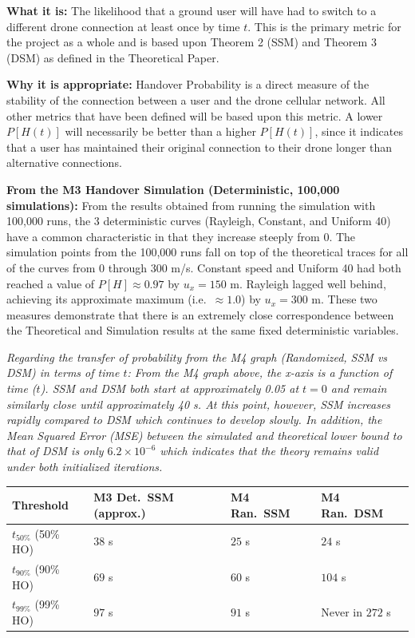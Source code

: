 \documentclass[11pt]{article}
\newcommand{\highlight}[1]{\textit{#1}}
\begin{document}
\begin{enumerate}[label=\textbf{Scribe Question \arabic*:}, leftmargin=*, itemsep=1.5em]
\textbf{What it is:} The likelihood that a ground user will have had to switch to a different drone
connection at least once by time $t$. This is the primary metric for the project as a whole and is
based upon Theorem 2 (SSM) and Theorem 3 (DSM) as defined in the Theoretical Paper.

\textbf{Why it is appropriate:} Handover Probability is a direct measure of the stability of the
connection between a user and the drone cellular network. All other metrics that have been defined
will be based upon this metric. A lower $P[H(t)]$ will necessarily be better than a higher $P[H(t)]$,
since it indicates that a user has maintained their original connection to their drone longer than
alternative connections.

\textbf{From the M3 Handover Simulation (Deterministic, 100,000 simulations):} From the results
obtained from running the simulation with 100,000 runs, the 3 deterministic curves (Rayleigh,
Constant, and Uniform 40) have a common characteristic in that they increase steeply from 0. The
simulation points from the 100,000 runs fall on top of the theoretical traces for all of the curves from
0 through 300 m/s. Constant speed and Uniform 40 had both reached a value of $P[H] \approx 0.97$
by $u_x = 150$ m. Rayleigh lagged well behind, achieving its approximate maximum
(i.e.\ $\approx 1.0$) by $u_x = 300$ m. These two measures demonstrate that there is an extremely
close correspondence between the Theoretical and Simulation results at the same fixed deterministic
variables.

\highlight{Regarding the transfer of probability from the M4 graph (Randomized, SSM vs DSM) in
terms of time $t$: From the M4 graph above, the x-axis is a function of time ($t$). SSM and DSM both
start at approximately 0.05 at $t=0$ and remain similarly close until approximately 40 s. At this point,
however, SSM increases rapidly compared to DSM which continues to develop slowly. In addition,
the Mean Squared Error (MSE) between the simulated and theoretical lower bound to that of DSM is
only $6.2 \times 10^{-6}$ which indicates that the theory remains valid under both initialized
iterations.}

\vspace{0.3cm}
\begin{center}
\begin{tabular}{llll}
    \toprule
    \textbf{Threshold} & \textbf{M3 Det.\ SSM (approx.)} & \textbf{M4 Ran.\ SSM} & \textbf{M4 Ran.\ DSM} \\
    \midrule
    $t_{50\%}$ (50\% HO) & $38$ s & $25$ s & $24$ s \\
    $t_{90\%}$ (90\% HO) & $69$ s & $60$ s & $104$ s \\
    $t_{99\%}$ (99\% HO) & $97$ s & $91$ s & Never in $272$ s \\
    \bottomrule
\end{tabular}
\end{center}
\vspace{0.3cm}


\end{enumerate}
\end{document}

